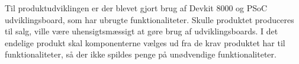 \noindent Til produktudviklingen er der blevet gjort brug af Devkit 8000 og PSoC udviklingsboard, som har ubrugte funktionaliteter. Skulle produktet produceres til salg, ville være uhensigtsmæssigt at gøre brug af udviklingsboards. I det endelige produkt skal komponenterne vælges ud fra de krav produktet har til funktionaliteter, så der ikke spildes penge på unødvendige funktionaliteter.